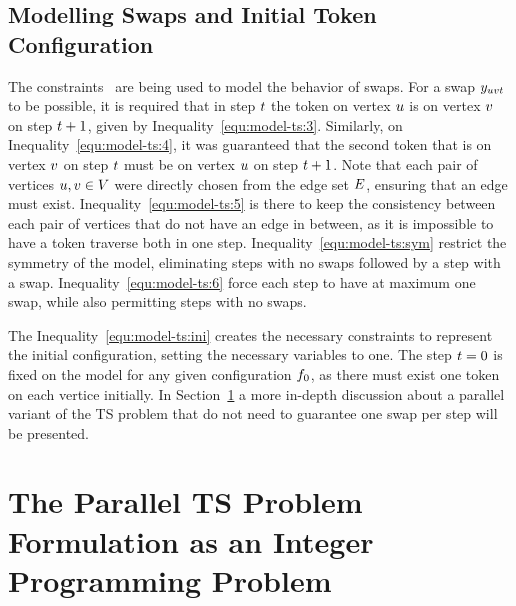 \documentclass[msc]{ppgccufmg}    %
\begin{document}



\subsection{Modelling Swaps and Initial Token Configuration}
\label{sec:formulation_ts:swaps}

The constraints~ are being used to 
model the behavior of swaps.
For a swap $y_{uvt}$ to be possible, it is required that in step $t$ 
the token on vertex $u$ is on vertex $v$ on step $t+1$, 
given by Inequality~\ref{equ:model-ts:3}.
Similarly, on Inequality~\ref{equ:model-ts:4}, it was guaranteed that the second 
token that is on vertex $v$ on step $t$ must be on vertex 
$u$ on step $t+1$.
Note that each pair of vertices $u,v \in V$ were 
directly chosen from the edge set $E$, ensuring that an edge must exist.
Inequality~\ref{equ:model-ts:5} is there to keep the consistency between each 
pair of vertices that do not have an edge in between, as it is impossible to have 
a token traverse both in one step.
Inequality~\ref{equ:model-ts:sym} restrict the symmetry of the model, eliminating
steps with no swaps followed by a step with a swap.
Inequality~\ref{equ:model-ts:6} force each step to have at maximum one swap, 
while also permitting steps with no swaps.

The Inequality~\ref{equ:model-ts:ini} creates the necessary constraints
to represent the initial configuration, setting the necessary variables
to one.
The step $t = 0$ is fixed on the model for any given configuration
$f_{0}$, as there must exist one token on each vertice initially.
In Section~\ref{sec:formulation_pts} a more in-depth discussion about a 
parallel variant of the TS problem that do not need to guarantee one 
swap per step will be presented.

\section{The Parallel TS Problem Formulation as an Integer Programming Problem}
\label{sec:formulation_pts}
\end{document}
